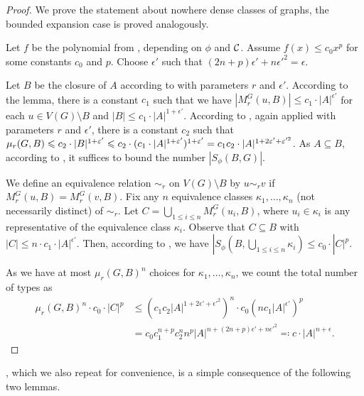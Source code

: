 \begin{proof}
We prove the statement about nowhere dense classes of graphs,
the bounded expansion case is proved analogously. 

Let $f$ be the polynomial from ,
depending on $\phi$ and $\mathcal{C}$. Assume $f(x)\leq c_0x^p$ 
for some constants $c_0$ and $p$. 
Choose $\epsilon'$ such that $(2n+p)\epsilon'+n\epsilon'^2=\epsilon$. 

Let $B$ be the closure of $A$ according to  with 
parameters $r$ and $\epsilon'$. According to the lemma, 
there is a constant $c_1$ such that 
we have $|M_r^G(u,B)|\leq c_1\cdot |A|^{\epsilon'}$ 
for each $u\in V(G)\setminus B$ and 
$|B|\leq c_1\cdot |A|^{1+\epsilon'}$. According to 
, again applied
with parameters $r$ and $\epsilon'$, 
there is a constant
$c_2$ such that 
$\mu_r(G,B)\leqslant c_2\cdot |B|^{1+\varepsilon'}\leqslant
c_2\cdot (c_1\cdot |A|^{1+\varepsilon'})^{1+\varepsilon'}=c_1c_2\cdot|A|^{1+2\varepsilon'+\varepsilon'^2}$.
As $A\subseteq B$, 
according to , it suffices to bound the
number $|S_\phi(B,G)|$. 

We define an equivalence relation $\sim_r$ on 
$V(G)\setminus B$ by $u\sim_r v$ if 
$M_r^G(u,B)=M_r^G(v,B)$. 
Fix any $n$ equivalence
classes $\kappa_1,\ldots, \kappa_n$ (not necessarily
distinct) of $\sim_r$. Let $C=\bigcup_{1\leq i\leq n}M_r^G(u_i, B)$, 
where $u_i\in \kappa_i$ is any representative of the
equivalence class $\kappa_i$. Observe that $C\subseteq B$ with
$|C|\leq n\cdot c_1\cdot |A|^{\epsilon'}$. 
Then, according to , 
we have $|S_\phi(B,\bigcup_{1\leq i\leq n}\kappa_i)\leq
c_0\cdot |C|^p$. 

As we have at most $\mu_r(G,B)^n$ choices for 
$\kappa_1,\ldots, \kappa_n$, we count the total 
number of types as 
\begin{align*}
\mu_r(G,B)^n\cdot c_0\cdot |C|^p& \leq \left(c_1c_2|A|^{1+2\epsilon'+\epsilon'^2}\right)^n\cdot c_0\left(nc_1|A|^{\epsilon'}\right)^p\\
& =c_0c_1^{n+p}c_2^nn^p|A|^{n+(2n+p)\epsilon'+n\epsilon'^2}\eqqcolon c \cdot |A|^{n+\epsilon}.
\end{align*}

\end{proof}

, which we also repeat for
convenience, is a simple consequence of the following two
lemmas. 

